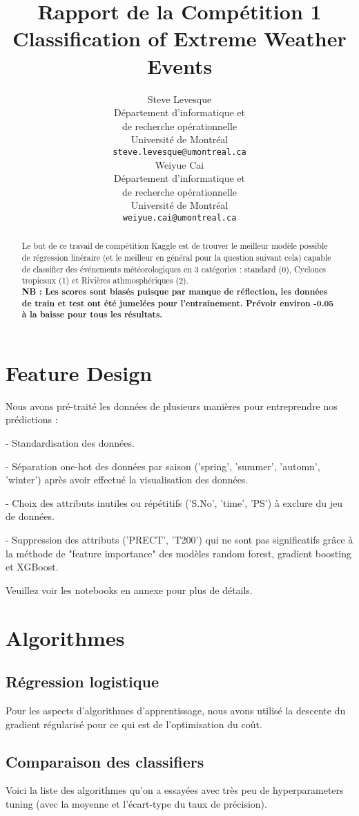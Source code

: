 \documentclass{article}
\title{
  Rapport de la Compétition 1 \\ 
  Classification of Extreme Weather Events
}
\author{%
  Steve Levesque \\
  Département d'informatique et \\
  de recherche opérationnelle\\
  Université de Montréal \\
  \texttt{steve.levesque@umontreal.ca} \\
  \And
  Weiyue Cai \\
  Département d'informatique et \\
  de recherche opérationnelle\\
  Université de Montréal \\
  \texttt{weiyue.cai@umontreal.ca} \\
}
\begin{document}
\maketitle

\begin{abstract}
  Le but de ce travail de compétition Kaggle est de trouver le meilleur modèle 
  possible de régression linéraire (et le meilleur en général pour la question 
  suivant cela) capable de classifier des événements météorologiques en 3 
  catégories : standard (0), Cyclones tropicaux (1) et Rivières athmosphériques 
  (2). \\

  \textbf{NB : Les scores sont biasés puisque par manque de réflection, les
  données de train et test ont été jumelées pour l'entraînement. Prévoir environ
  -0.05 à la baisse pour tous les résultats.}
\end{abstract}

\section{Feature Design}
Nous avons pré-traité les données de plusieurs manières pour entreprendre nos 
prédictions :

- Standardisation des données.

- Séparation one-hot des données par saison ('spring', 'summer', 'automn', 
'winter') après avoir effectué la visualisation des données. 

- Choix des attributs inutiles ou répétitifs ('S.No', 'time', 'PS') à exclure 
du jeu de données. 

- Suppression des attributs ('PRECT', 'T200') qui ne sont pas significatifs 
grâce à la méthode de "feature importance" des modèles random forest, gradient 
boosting et XGBoost. 

Veuillez voir les notebooks en annexe pour plus de détails.


\section{Algorithmes}
\subsection{Régression logistique}
Pour les aspects d'algorithmes d'apprentissage, nous avons utilisé la descente 
du gradient régularisé pour ce qui est de l'optimisation du coût.

\subsection{Comparaison des classifiers}
Voici la liste des algorithmes qu'on a essayées avec très peu de hyperparameters 
tuning (avec la moyenne et l'écart-type du taux de précision).
\end{document}
